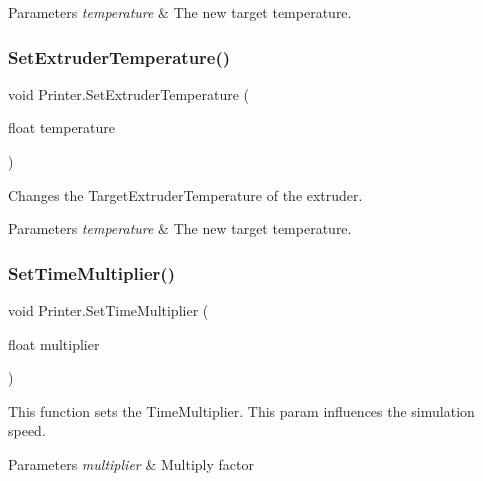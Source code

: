 \begin{DoxyParams}{Parameters}
{\em temperature} & The new target temperature.\\
\hline
\end{DoxyParams}
\mbox{\label{class_printer_a0a643543a8efddd43be14a38f79bb2f6}} 
\subsubsection{\texorpdfstring{Set\+Extruder\+Temperature()}{SetExtruderTemperature()}}
{\footnotesize\ttfamily void Printer.\+Set\+Extruder\+Temperature (\begin{DoxyParamCaption}\item[{float}]{temperature }\end{DoxyParamCaption})}



Changes the Target\+Extruder\+Temperature of the extruder. 


\begin{DoxyParams}{Parameters}
{\em temperature} & The new target temperature.\\
\hline
\end{DoxyParams}
\mbox{\label{class_printer_ab90889903063563e05b7c6409a944752}} 
\subsubsection{\texorpdfstring{Set\+Time\+Multiplier()}{SetTimeMultiplier()}}
{\footnotesize\ttfamily void Printer.\+Set\+Time\+Multiplier (\begin{DoxyParamCaption}\item[{float}]{multiplier }\end{DoxyParamCaption})}



This function sets the Time\+Multiplier. This param influences the simulation speed. 


\begin{DoxyParams}{Parameters}
{\em multiplier} & Multiply factor\\
\hline
\end{DoxyParams}
\mbox{\label{class_printer_a4d61c283439ea47644d326c802fd405a}} 

